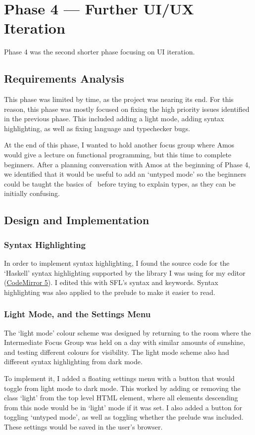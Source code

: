 \chapter{Phase 4 --- Further UI/UX Iteration}
Phase 4 was the second shorter phase focusing on UI iteration. 

\section{Requirements Analysis}
This phase was limited by time, as the project was nearing its end. For this reason, this phase was mostly focused on fixing the high priority issues identified in the previous phase. This included adding a light mode, adding syntax highlighting, as well as fixing language and typechecker bugs. 

At the end of this phase, I wanted to hold another focus group where Amos would give a lecture on functional programming, but this time to complete beginners. After a planning conversation with Amos at the beginning of Phase 4, we identified that it would be useful to add an `untyped mode' so the beginners could be taught the basics of \lcalc\ before trying to explain types, as they can be initially confusing. 

\section{Design and Implementation}
\subsection{Syntax Highlighting}
In order to implement syntax highlighting, I found the source code for the `Haskell' syntax highlighting supported by the library I was using for my editor (\href{https://codemirror.net/5/}{CodeMirror 5}). I edited this with SFL's syntax and keywords. Syntax highlighting was also applied to the prelude to make it easier to read. 

\subsection{Light Mode, and the Settings Menu}
The `light mode' colour scheme was designed by returning to the room where the Intermediate Focus Group was held on a day with similar amounts of sunshine, and testing different colours for visibility. The light mode scheme also had different syntax highlighting from dark mode. 

To implement it, I added a floating settings menu with a button that would toggle from light mode to dark mode. This worked by adding or removing the class `light' from the top level HTML element, where all elements descending from this node would be in `light' mode if it was set. I also added a button for toggling `untyped mode', as well as toggling whether the prelude was included. These settings would be saved in the user's browser.

